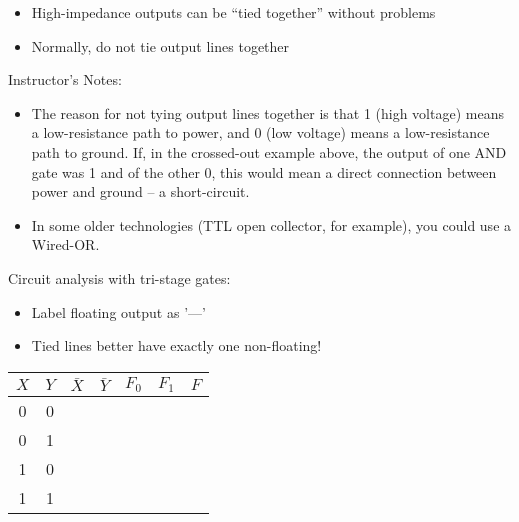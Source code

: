 \begin{frame}[fragile]
\begin{itemize}
\item High-impedance outputs can be ``tied together'' without problems
\item Normally, do not tie output lines together
\end{itemize}
\end{frame}

\BNotes\ifnum{}
\begin{frame}[fragile]
Instructor's Notes:
\begin{itemize}
\item The reason for not tying output lines together is that 1 (high
voltage) means a low-resistance path to power, and 0 (low voltage)
means a low-resistance path to ground. If, in the crossed-out example
above, the output of one AND gate was 1 and of the other 0, this would
mean a direct connection between power and ground -- a short-circuit.
\item In some older technologies (TTL open collector, for example), you
	could use a Wired-OR.
\end{itemize}
\end{frame}
\fi\ENotes

\begin{frame}[fragile]

        Circuit analysis with tri-stage gates:
        \begin{itemize}
                \item Label floating output as '---'
                \item Tied lines better have exactly one non-floating!
        \end{itemize}
        \begin{center}
        \begin{tabular}{cc|cc|cc|c}
                $X$ & $Y$ & $\bar{X}$ & $\bar{Y}$ & $F_0$ & $F_1$ & $F$\\
                \hline
                0 & 0 &&&&&\\
                0 & 1 &&&&&\\
                1 & 0 &&&&&\\
                1 & 1 &&&&&
        \end{tabular}
        \end{center}                                                            
\BNotes\ifnum{}
~
\fi\ENotes
\end{frame}

